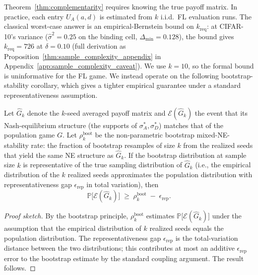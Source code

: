 \documentclass{article}
\newcommand{\UA}{U_A}
\begin{document}
Theorem~\ref{thm:complementarity} requires knowing the true payoff matrix. In practice, each entry $\UA(a,d)$ is estimated from $k$ i.i.d.\ FL evaluation runs. The classical worst-case answer is an empirical-Bernstein bound on $k_{\mathrm{req}}$: at CIFAR-10's variance ($\hat\sigma^2{=}0.25$ on the binding cell, $\Delta_{\min}{=}0.128$), the bound gives $k_{\mathrm{req}}=726$ at $\delta=0.10$ (full derivation as Proposition~\ref{thm:sample_complexity_appendix} in Appendix~\ref{app:sample_complexity_caveat}). We use $k=10$, so the formal bound is uninformative for the FL game. We instead operate on the following bootstrap-stability corollary, which gives a tighter empirical guarantee under a standard representativeness assumption.

\begin{proposition}
\label{prop:bootstrap_pac}
Let $\hat G_k$ denote the $k$-seed averaged payoff matrix and $\mathcal{E}(\hat G_k)$ the event that its Nash-equilibrium structure (the supports of $\sigma_A^*, \sigma_D^*$) matches that of the population game $G$. Let $\rho_k^{\mathrm{boot}}$ be the non-parametric bootstrap mixed-NE-stability rate: the fraction of bootstrap resamples of size $k$ from the realized seeds that yield the same NE structure as $\hat G_k$. If the bootstrap distribution at sample size $k$ is representative of the true sampling distribution of $\hat G_k$ (i.e., the empirical distribution of the $k$ realized seeds approximates the population distribution with representativeness gap $\epsilon_{\mathrm{rep}}$ in total variation), then
\begin{equation}
\mathbb{P}\bigl[\mathcal{E}(\hat G_k)\bigr] \;\geq\; \rho_k^{\mathrm{boot}} \;-\; \epsilon_{\mathrm{rep}}.
\label{eq:bootstrap_pac}
\end{equation}
\end{proposition}
\begin{proof}[Proof sketch]
By the bootstrap principle, $\rho_k^{\mathrm{boot}}$ estimates $\mathbb{P}\bigl[\mathcal{E}(\hat G_k)\bigr]$ under the assumption that the empirical distribution of $k$ realized seeds equals the population distribution. The representativeness gap $\epsilon_{\mathrm{rep}}$ is the total-variation distance between the two distributions; this contributes at most an additive $\epsilon_{\mathrm{rep}}$ error to the bootstrap estimate by the standard coupling argument. The result follows.
\end{proof}
\end{document}
